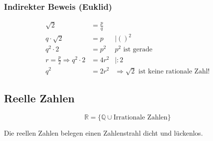 \subsubsection{Indirekter Beweis (Euklid)}

\[
	\begin{alignedat}{2}
		\sqrt{2} &= \frac{p}{q} \\
		q \cdot \sqrt{2} &= p &\mid {()}^2 \\
		q^2 \cdot 2 &= p^2 &p^2 \text{ ist gerade} \\
		r = \frac{p}{2} \Rightarrow q^2 \cdot 2 &= 4r^2  &\mid :2 \\
		q^2 &= 2r^2 &\Rightarrow \sqrt{2} \text{ ist keine rationale Zahl!}
	\end{alignedat}
\]

\subsection{Reelle Zahlen}

\[
	\mathbb{R} = \{\mathbb{Q} \cup \text{Irrationale Zahlen}\}
\]

Die reellen Zahlen belegen einen Zahlenstrahl dicht und lückenlos.


